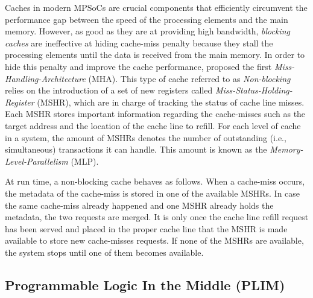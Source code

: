     Caches in modern MPSoCs are crucial components that efficiently circumvent the performance gap between the speed of the processing elements and the main memory.
    However, as good as they are at providing high bandwidth, \emph{blocking caches} are ineffective at hiding cache-miss penalty because they stall the processing elements until the data is received from the main memory.
    In order to hide this penalty and improve the cache performance, \cite{Kroft} proposed the first \emph{Miss-Handling-Architecture} (MHA).
    This type of cache referred to as \emph{Non-blocking} relies on the introduction of a set of new registers called \emph{Miss-Status-Holding-Register} (MSHR), which are in charge of tracking the status of cache line misses.
    Each MSHR stores important information regarding the cache-misses such as the target address and the location of the cache line to refill.
    For each level of cache in a system, the amount of MSHRs denotes the number of outstanding (i.e., simultaneous) transactions it can handle.
    This amount is known as the \emph{Memory-Level-Parallelism} (MLP).

    At run time, a non-blocking cache behaves as follows.
    When a cache-miss occurs, the metadata of the cache-miss is stored in one of the available MSHRs.
    In case the same cache-miss already happened and one MSHR already holds the metadata, the two requests are merged.
    It is only once the cache line refill request has been served and placed in the proper cache line that the MSHR is made available to store new cache-misses requests.
    If none of the MSHRs are available, the system stops until one of them becomes available.

    \subsection{Programmable Logic In the Middle (PLIM)}

